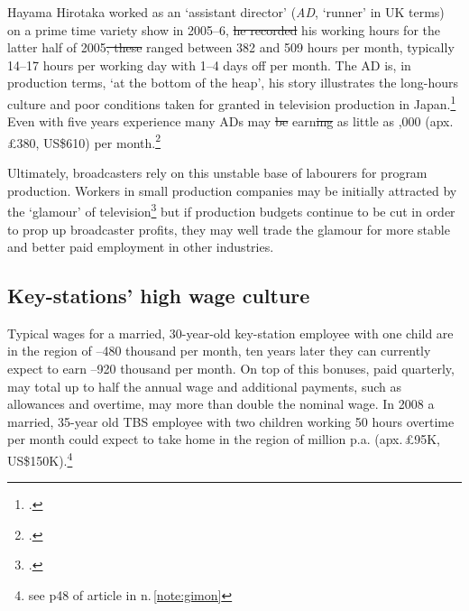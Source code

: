 \documentclass[11pt, oneside, a4paper, headsepline]{scrartcl}
\newcommand{\citej}[2] {\footcite[\nopp #1]{#2} }
\newcommand{\ty}{\textyen}
\begin{document}
Hayama Hirotaka worked as an `assistant director' (\emph{AD}, `runner' in UK terms) on a prime time variety show in 2005--6, \st{he recorded} his working hours for the latter half of 2005\st{, these } ranged between 382 and 509 hours per month, typically 14--17 hours per working day with 1--4 days off per month. The AD is, in production terms, `at the bottom of the heap', his story illustrates the long-hours culture and poor conditions taken for granted in television production in Japan.\footcite{Hayama:2010} Even with five years experience many ADs may \st{be} earn\st{ing} as little as \ty50,000 (apx.\,\pounds380, US\$610) per month.\citej{85}{Tanami:2006} 

Ultimately, broadcasters rely on this unstable base of labourers for program production. Workers in small production companies may be initially attracted by the `glamour' of television\citej{51}{Shimazaki:2009} but if production budgets continue to be cut in order to prop up broadcaster profits, they may well trade the glamour for more stable and better paid employment in other industries.


\subsection{Key-stations' high wage culture}
\label{subsec:highwages}

Typical wages for a married, 30-year-old key-station employee with one child are in the region of \ty350--480 thousand per month, ten years later they can currently expect to earn \ty420--920 thousand per month. On top of this bonuses, paid quarterly, may total up to half the annual wage and additional payments, such as allowances and overtime, may more than double the nominal wage. In 2008 a married, 35-year old TBS employee with two children working 50 hours overtime per month could expect to take home in the region of \ty13 million p.a. (apx.\,\pounds95K, US\$150K).\footnote{see p48 of article in n.\,\ref{note:gimon}} 
\end{document}
